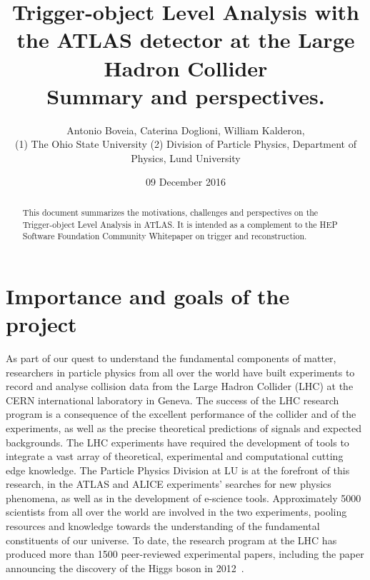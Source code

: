 \documentclass[a4paper,justified]{tufte-handout}
\title{Trigger-object Level Analysis with the ATLAS detector at the Large Hadron Collider\\ Summary and perspectives.}
\author[Experiment]{Antonio Boveia, Caterina Doglioni, William Kalderon,\\
(1) The Ohio State University (2) Division of Particle Physics, Department of Physics, Lund University}
\date{09 December 2016}  %
\begin{document}

\maketitle%




\begin{fullwidth}
\vspace{-10px}

\begin{abstract}


\noindent This document summarizes the motivations, challenges and perspectives on the Trigger-object Level Analysis in ATLAS. It is intended as a complement to the HEP Software Foundation Community Whitepaper on trigger and reconstruction. 
\end{abstract}

\end{fullwidth}


\vspace{-15px}
\section{Importance and goals of the project}\label{sec:goals}
\vspace{-10px}


As part of our quest to understand the fundamental components of matter, researchers
in particle physics from all over the world have built experiments to record
and analyse collision data from the Large Hadron Collider (LHC) at the CERN
international laboratory in Geneva.  The success of the LHC research program
is a consequence of the excellent performance of the collider and of the experiments, as well as the precise
theoretical predictions of signals and expected backgrounds. The LHC experiments have required the
development of tools to integrate a vast array of theoretical, experimental
and computational cutting edge knowledge. The Particle Physics Division at
LU is at the forefront of this research, in the ATLAS and ALICE
experiments' searches for new physics phenomena, as well as in the development
of e-science tools. Approximately 5000 scientists from all over the world are
involved in the two experiments, pooling resources and knowledge towards the
understanding of the fundamental constituents of our universe. To date, the
research program at the LHC has produced more than 1500 peer-reviewed
experimental papers, including the paper announcing the discovery of the Higgs
boson in 2012~\cite{Aad:2012tfa}.
\end{document}

